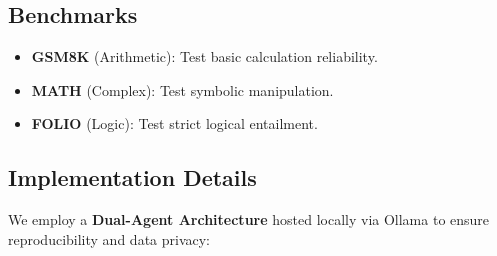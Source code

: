 \documentclass[11pt]{article}
\begin{document}
\subsection{Benchmarks}
\begin{itemize}
\item \textbf{GSM8K} (Arithmetic): Test basic calculation reliability.
\item \textbf{MATH} (Complex): Test symbolic manipulation.
\item \textbf{FOLIO} (Logic): Test strict logical entailment.
\end{itemize}

\subsection{Implementation Details}
We employ a \textbf{Dual-Agent Architecture} hosted locally via Ollama to ensure reproducibility and data privacy:
\end{document}
